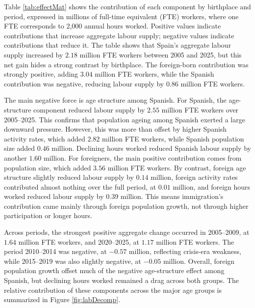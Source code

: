 Table \ref{tab:effectMat} shows the contribution of each component by birthplace and period, expressed in millions of full-time equivalent (FTE) workers, where one FTE corresponds to 2,000 annual hours worked. Positive values indicate contributions that increase aggregate labour supply; negative values indicate contributions that reduce it. The table shows that Spain's aggregate labour supply increased by \(2.18\) million FTE workers between 2005 and 2025, but this net gain hides a strong contrast by birthplace. The foreign-born contribution was strongly positive, adding \(3.04\) million FTE workers, while the Spanish contribution was negative, reducing labour supply by \(0.86\) million FTE workers.


\begin{table}[H]%
  \caption{Decomposition of changes in aggregate labour supply by birthplace, component, and period, Spain.}

  \label{tab:effectMat}%
  \begin{center}
    \caption*{\small Note: Values are expressed in millions of full-time equivalent (FTE) workers.}
  \end{center}
\end{table}%



\vspace{0.7em}\par
The main negative force is age structure among Spanish. For Spanish, the age-structure component reduced labour supply by \(2.55\) million FTE workers over 2005--2025. This confirms that population ageing among Spanish exerted a large downward pressure. However, this was more than offset by higher Spanish activity rates, which added \(2.82\) million FTE workers, while Spanish population size added \(0.46\) million. Declining hours worked reduced Spanish labour supply by another \(1.60\) million. For foreigners, the main positive contribution comes from population size, which added \(3.56\) million FTE workers. By contrast, foreign age structure slightly reduced labour supply by \(0.14\) million, foreign activity rates contributed almost nothing over the full period, at \(0.01\) million, and foreign hours worked reduced labour supply by \(0.39\) million. This means immigration's contribution came mainly through foreign population growth, not through higher participation or longer hours.

\vspace{0.7em}\par
Across periods, the strongest positive aggregate change occurred in 2005--2009, at \(1.64\) million FTE workers, and 2020--2025, at \(1.17\) million FTE workers. The period 2010--2014 was negative, at \(-0.57\) million, reflecting crisis-era weakness, while 2015--2019 was also slightly negative, at \(-0.05\) million. Overall, foreign population growth offset much of the negative age-structure effect among Spanish, but declining hours worked remained a drag across both groups. The relative contribution of these components across the major age groups is summarized in Figure \ref{fig:labDecomp}.


